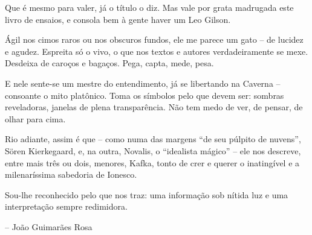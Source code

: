 \clearpage
\thispagestyle{empty}

Que é mesmo para valer, já o título o diz. Mas vale por grata madrugada este livro de ensaios, e consola bem à gente haver um Leo Gilson.

Ágil nos cimos raros ou nos obscuros fundos, ele me parece um gato – de lucidez e agudez. Espreita só o vivo, o que nos textos e autores verdadeiramente se mexe. Desdeixa de caroços e bagaços. Pega, capta, mede, pesa.

E nele sente-se um mestre do entendimento, já se libertando na Caverna – consoante o mito platônico. Toma os símbolos pelo que devem ser: sombras reveladoras, janelas de plena transparência. Não tem medo de ver, de pensar, de olhar para cima.

Rio adiante, assim é que – como numa das margens “de seu púlpito de nuvens”, Sören Kierkegaard, e, na outra, Novalis, o “idealista mágico” – ele nos descreve, entre mais três ou dois, menores, Kafka, tonto de crer e querer o inatingível e a milenaríssima sabedoria de Ionesco.

Sou-lhe reconhecido pelo que nos traz: uma informação sob nítida luz e uma interpretação sempre redimidora.

-- João Guimarães Rosa

\clearpage
